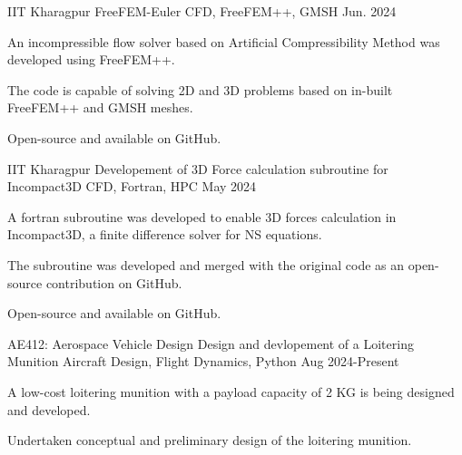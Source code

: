 \begin{cventries}
  \cventry
  {IIT Kharagpur} %
  {FreeFEM-Euler} %
  {CFD, FreeFEM++, GMSH} %
  {Jun. 2024} %
  {
    \begin{cvitems} %
      \item {An incompressible flow solver based on Artificial Compressibility Method was developed using FreeFEM++.}
      \item {The code is capable of solving 2D and 3D problems based on in-built FreeFEM++ and GMSH meshes.}
      \item {Open-source and available on GitHub.}
    \end{cvitems}
  }

  \cventry
  {IIT Kharagpur} %
  {Developement of 3D Force calculation subroutine for Incompact3D} %
  {CFD, Fortran, HPC} %
  {May 2024} %
  {
    \begin{cvitems} %
      \item {A fortran subroutine was developed to enable 3D forces calculation in Incompact3D, a finite difference solver for NS equations.}
      \item {The subroutine was developed and merged with the original code as an open-source contribution on GitHub.}
      \item {Open-source and available on GitHub.}
    \end{cvitems}
  }

  \cventry
  {AE412: Aerospace Vehicle Design} %
  {Design and devlopement of a Loitering Munition} %
  {Aircraft Design, Flight Dynamics, Python} %
  {Aug 2024-Present} %
  {
    \begin{cvitems} %
      \item {A low-cost loitering munition with a payload capacity of 2 KG is being designed and developed.}
      \item {Undertaken conceptual and preliminary design of the loitering munition.}
    \end{cvitems}
  }
\end{cventries}
